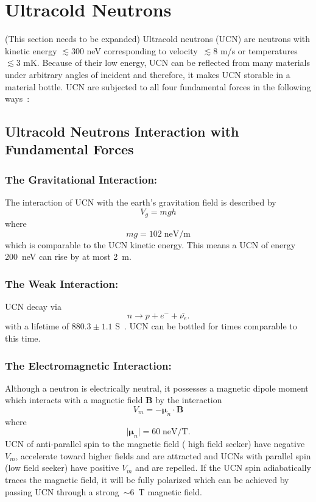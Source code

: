 

\section{Ultracold Neutrons}
(This section needs to be expanded)
Ultracold neutrons (UCN) are neutrons with kinetic energy $\lesssim
300$ neV corresponding to velocity~$\lesssim 8$ m/s or temperatures
$\lesssim 3$ mK. Because of their low energy, UCN can be reflected
from many materials under arbitrary angles of incident and therefore,
it makes UCN storable in a material bottle. UCN are subjected to all
four fundamental forces in the following
ways~\cite{beatrice,knecht,golub1994neutron,golub1991ultra}:

\subsection{Ultracold Neutrons Interaction with Fundamental Forces}

\subsubsection{The Gravitational Interaction:}
The interaction of UCN with the earth's gravitation field is described by
\begin{equation}
V_g=mgh
\end{equation}
where
\begin{equation}
mg=102\; \text{neV/m}
\end{equation}
which is comparable to the UCN kinetic energy. This means a UCN of
energy 200~neV can rise by at most 2~m.

 \subsubsection{The Weak Interaction:}
UCN decay via
\label{neutrondecay}
\begin{equation}
n\longrightarrow p+e^{-}+\bar{\nu_{e}}.
\end{equation}
with a lifetime of $880.3\pm 1.1$ S~\cite{PDG}. UCN can be bottled for
times comparable to this time.

\subsubsection{The Electromagnetic Interaction:} Although a neutron is
electrically neutral, it possesses a magnetic dipole moment which
interacts with a magnetic field \textbf{B} by the interaction
\begin{equation}
V_m=-\boldsymbol{\mu}_n \cdot \textbf{B}
\end{equation}
where
\begin{equation}
\vert \boldsymbol{\mu}_n \vert =60 \; \text{neV/T}.
\end{equation}
\indent UCN of anti-parallel spin to the magnetic field ( high field
seeker) have negative $V_m$, accelerate toward higher fields and are
attracted and UCNs with parallel spin (low field seeker) have positive
$V_m$ and are repelled. If the UCN spin adiabatically traces the
magnetic field, it will be fully polarized which can be achieved by
passing UCN through a strong~$\sim 6$~T magnetic field.

